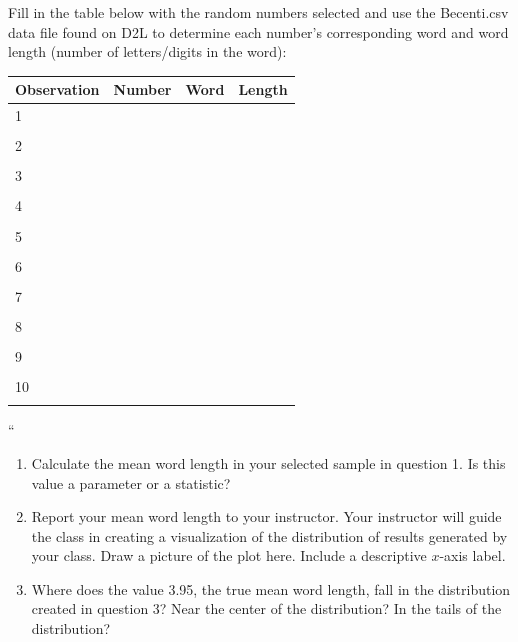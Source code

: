 \documentclass[
]{report}
\begin{document}
\newpage

Fill in the table below with the random numbers selected and use the Becenti.csv data file found on D2L to determine each number's corresponding word and word length (number of letters/digits in the word):

\begin{center}
\begin{tabular}{|l|l|p{3in}|p{1in}|} \hline
Observation & Number & Word & Length  \\ \hline
1 & & & \\ 
& & & \\ \hline
2 & & & \\ 
& & & \\ \hline
3 & & & \\ 
& & & \\ \hline
4 & & & \\ 
& & & \\ \hline
5 & & & \\ 
& & & \\ \hline
6 & & & \\ 
& & & \\ \hline
7 & & & \\
& & & \\ \hline
8 & & & \\ 
& & & \\ \hline
9 & & &\\ 
& & & \\ \hline
10 & & & \\ 
& & & \\ \hline
\end{tabular}
\end{center}

``

\begin{enumerate}
\def\labelenumi{\arabic{enumi}.}
\setcounter{enumi}{1}
\item
  Calculate the mean word length in your selected sample in question 1. Is this value a parameter or a statistic?
  \vspace{0.3in}
\item
  Report your mean word length to your instructor. Your instructor will guide the class in creating a visualization of the distribution of results generated by your class. Draw a picture of the plot here. Include a descriptive \(x\)-axis label.
  \vspace{1.7in}
\item
  Where does the value 3.95, the true mean word length, fall in the distribution created in question 3? Near the center of the distribution? In the tails of the distribution?
  \vspace{0.3in}
\end{enumerate}
\end{document}
